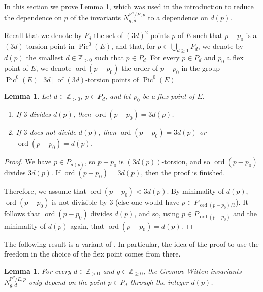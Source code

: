 \documentclass[11pt,letterpaper]{amsart}
\newtheorem{lem}[defn]{Lemma}
\newcommand\PP{\mathbb P}
\newcommand\Z{\mathbb Z}
\newcommand\Pic{\operatorname{Pic}}
\newcommand\ord{\operatorname{ord}}
\begin{document}
In this section we prove Lemma \ref{lem_monodromy}, which was used in the introduction to reduce the dependence on $p$ of the invariants $N_{g,d}^{\PP^2/E,p}$ to a dependence on $d(p)$.

Recall that we denote by $P_d$ the set of $(3d)^2$ points $p$ of $E$ such that $p-p_0$ is a $(3d)$-torsion point in $\Pic^0(E)$, and  that, 
for $p \in \bigcup_{d \geqslant 1} P_d$, we denote by
$d(p)$ the smallest $d \in \Z_{>0}$ such that 
$p \in P_d$.
For every $p \in P_d$ and $p_0$ a flex point of $E$, we denote $\ord(p-p_0)$ the order of $p-p_0$ in the group 
$\Pic^0(E)[3d]$ of $(3d)$-torsion 
points of $\Pic^0(E)$

\begin{lem}\label{lem_divisibility}
Let $d \in \Z_{>0}$, $p \in P_d$, and let $p_0$ be a flex point of $E$.
\begin{enumerate}
    \item If $3$ divides $d(p)$, then $\ord(p-p_0)=3d(p)$.
    \item If $3$ does not divide $d(p)$, then 
    $\ord(p-p_0)=3d(p)$ or $\ord(p-p_0)=d(p)$.
\end{enumerate}
\end{lem}

\begin{proof}
We have $p \in P_{d(p)}$, so $p-p_0$ is $(3d(p))$-torsion, and so $\ord(p-p_0)$ divides $3d(p)$. If 
$\ord(p-p_0)=3d(p)$, then the proof is finished. 

Therefore, we assume that 
$\ord(p-p_0)<3d(p)$. By minimality of $d(p)$, $\ord(p-p_0)$ is not divisible by $3$ (else one would have $p \in P_{\ord(p-p_0)/3}$). 
It follows that $\ord(p-p_0)$ divides 
$d(p)$, and so, using $p \in P_{\ord(p-p_0)}$ and  the minimality of $d(p)$ again, that
$\ord(p-p_0)=d(p)$.
\end{proof}

The following result is a variant of \cite[Lemma 4.13]{choi2018log}. In particular, the idea of the proof to use the freedom in the choice of the flex point comes from there.


\begin{lem} \label{lem_monodromy}
For every $d \in \Z_{>0}$
and $g\in \Z_{\geqslant 0}$, the 
Gromov-Witten invariants $N_{g,d}^{\PP^2/E,p}$ only depend on the point $p \in P_d$ through the integer $d(p)$. 
\end{lem}
\end{document}
